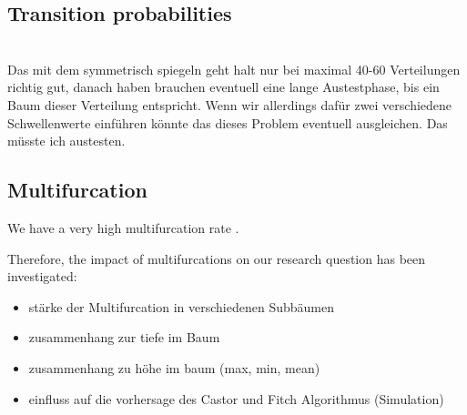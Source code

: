     \subsection{Transition probabilities}
       \\
      Das mit dem symmetrisch spiegeln geht halt nur bei maximal 40-60 Verteilungen richtig gut, danach 
      haben brauchen eventuell eine lange Austestphase, bis ein Baum dieser Verteilung entspricht.
      Wenn wir allerdings dafür zwei verschiedene Schwellenwerte einführen könnte das dieses Problem 
      eventuell ausgleichen. Das müsste ich austesten. 


    \subsection{Multifurcation}
      We have a very high multifurcation rate \pageref{sec:ResultsMultifurcation}.

      Therefore, the impact of multifurcations on our research question has been investigated:
      \begin{itemize}
        \item stärke der Multifurcation in verschiedenen Subbäumen
        \item zusammenhang zur tiefe im Baum
        \item zusammenhang zu höhe im baum (max, min, mean)
        \item einfluss auf die vorhersage des Castor und Fitch Algorithmus (Simulation) 
      \end{itemize}

